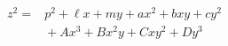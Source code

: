 \begin{proposition}
\[
    \begin{aligned}z^2={}&p^2+\ell x+my+ax^2+bxy+cy^2\\&{}+Ax^3+Bx^2y+Cxy^2+Dy^3\end{aligned}
\]
\end{proposition}
